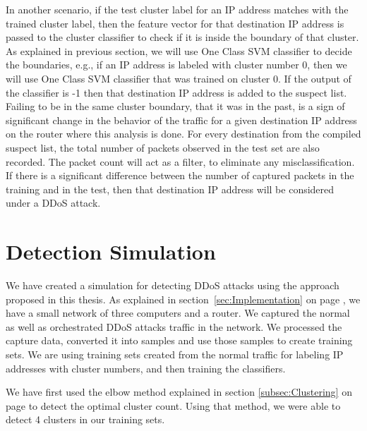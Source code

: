 \documentclass[12pt,oneside,a4paper]{article}
\begin{document}
In another scenario, if the test cluster label for an IP address matches with the trained cluster label, then the feature vector for that destination IP address is passed to the cluster classifier to check if it is inside the boundary of that cluster. As explained in previous section, we will use One Class SVM classifier to decide the boundaries, e.g., if an IP address is labeled with cluster number 0, then we will use One Class SVM classifier that was trained on cluster 0. If the output of the classifier is -1 then that destination IP address is added to the suspect list. Failing to be in the same cluster boundary, that it was in the past, is a sign of significant change in the behavior of the traffic for a given destination IP address on the router where this analysis is done. For every destination from the compiled suspect list, the total number of packets observed in the test set are also recorded. The packet count will act as a filter, to eliminate any misclassification. If there is a significant difference between the number of captured packets in the training and in the test, then that destination IP address will be considered under a DDoS attack.
\pagebreak
\section{Detection Simulation}

We have created a simulation for detecting DDoS attacks using the approach proposed in this thesis. As explained in section~\ref{sec:Implementation} on page \pageref{sec:Implementation}, we have a small network of three computers and a router. We captured the normal as well as orchestrated DDoS attacks traffic in the network. We processed the capture data, converted it into samples and use those samples to create training sets. We are using training sets created from the normal traffic for labeling IP addresses with cluster numbers, and then training the classifiers.

We have first used the elbow method explained in section \ref{subsec:Clustering} on page \pageref{subsec:Clustering} to detect the optimal cluster count. Using that method, we were able to detect 4 clusters in our training sets.
\end{document}
